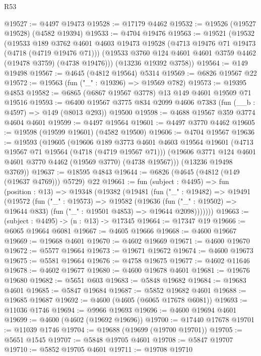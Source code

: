 \begin{lexlean}{R53}
\begin{coremodule}
@19527 := @4497 @19473
@19528 := @17179 @4462
@19532 := @19526 (@19527 @19528) (@4582 @19394)
@19533 := @4704 @19476
@19563 := @19521
    (@19532
      (@19533
        @189
        @3762
        @4601
        @4603
        @19473
        @19528
        (@4713 @19476 @71 @19473 (@4718 (@4719 @19476 @71)))
        (@19533 @3760 @124 @4601 @4601 @3759 @4462 (@19478 @3759) (@4738 @19476)))
      (@13236 @19392 @3758))
@19564 := @149 @19498
@19567 := @4645 (@4812 @19564) @5314
@19569 := @6826 @19567 @22
@19572 := @19563 (fun ("_" : @19396) => @19569 @782)
@19573 := @19395 @4853
@19582 := @6865 (@6867 @19567 @3778) @13 @149 @4601 @19509 @71 @19516
@19593 := @6400 @19567 @3775 @834 @2099 @4606 @7383 (fun (__b : @4597) => @149 (@8013 @293)) @19500
@19598 := @4688 @19567 @359 @3774 @4604 @4601
@19599 := @4497 @19564
@19601 := @4497 @3770 @4462
@19605 := @19598 (@19599 @19601) (@4582 @19500)
@19606 := @4704 @19567
@19636 := @19593
    (@19605
      (@19606
        @189
        @3773
        @4601
        @4603
        @19564
        @19601
        (@4713 @19567 @71 @19564 (@4718 (@4719 @19567 @71)))
        (@19606 @3771 @124 @4601 @4601 @3770 @4462 (@19569 @3770) (@4738 @19567)))
      (@13236 @19498 @3769))
@19637 := @18595 @4843
@19644 := @6826 (@4645 (@4812 (@149 (@19637 @4769))) @5729) @22
@19661 := fun (subject : @4495) =>
  fun (position : @13) =>
  @19348
    (@19382
      (@19481
        (fun ("_" : @19482) =>
        @19491
          (@19572
            (fun ("_" : @19573) =>
            @19582
              (@19636
                (fun ("_" : @19502) => @19644 @833)
                (fun ("_" : @19501 @4853) => @19644 @2098)))))))
@19663 := (subject : @4495) -> (n : @13) -> @17345
@19664 := @17347 @19
@19666 := @6065 @19664 @6081
@19667 := @4605 @19666
@19668 := @4600 @19667
@19669 := @19668 @4601
@19670 := @4602 @19669
@19671 := @4600 @19670
@19672 := @5577 @19664
@19673 := @19671 @19672
@19674 := @4600 @19673
@19675 := @5581 @19664
@19676 := @4758 @19675
@19677 := @4602 @11646
@19678 := @4602 @19677
@19680 := @4600 @19678 @4601
@19681 := @19676 @19680
@19682 := @5651 @603
@19683 := @5848 @19682
@19684 := @19683 @4601
@19685 := @5847 @19684
@19687 := @5852 @19682 @4601
@19688 := @19685 @19687
@19692 := @4600 (@4605 (@6065 @17678 @6081))
@19693 := @11036 @1746
@19694 := @9966 @19693
@19696 := @4600 @19694 @4601
@19699 := @4600 (@4602 (@19692 @19696))
@19700 := @17440 @17678
@19701 := @11039 @1746
@19704 := @19688 (@19699 (@19700 @19701))
@19705 := @5651 @1545
@19707 := @5848 @19705 @4601
@19708 := @5847 @19707
@19710 := @5852 @19705 @4601
@19711 := @19708 @19710

\end{coremodule}
\end{lexlean}
